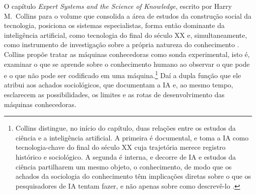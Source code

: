 O capítulo \textit{Expert Systems and the Science of Knowledge}, escrito por Harry M.~Collins para o volume que consolida a área de estudos da construção social da tecnologia, posiciona os sistemas especialistas, forma então dominante da inteligência artificial, como tecnologia do final do século XX e, simultaneamente, como instrumento de investigação sobre a própria natureza do conhecimento \parencite{Collins2012Expert}. Collins propõe tratar as máquinas conhecedoras como sonda experimental, isto é, examinar o que se aprende sobre o conhecimento humano ao observar o que pode e o que não pode ser codificado em uma máquina.\footnote{Collins distingue, no início do capítulo, duas relações entre os estudos da ciência e a inteligência artificial. A primeira é documental, e toma a IA como tecnologia-chave do final do século XX cuja trajetória merece registro histórico e sociológico. A segunda é interna, e decorre de IA e estudos da ciência partilharem um mesmo objeto, o conhecimento, de modo que os achados da sociologia do conhecimento têm implicações diretas sobre o que os pesquisadores de IA tentam fazer, e não apenas sobre como descrevê-lo \parencite[p.~321]{Collins2012Expert}.} Daí a dupla função que ele atribui aos achados sociológicos, que documentam a IA e, ao mesmo tempo, esclarecem as possibilidades, os limites e as rotas de desenvolvimento das máquinas conhecedoras.

